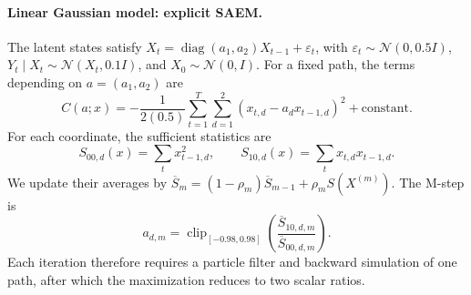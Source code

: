 \documentclass[11pt]{article}
\theoremstyle{thmstylethree}%
\begin{document}
\paragraph{Linear Gaussian model: explicit SAEM.}
The latent states satisfy
$X_t=\operatorname{diag}(a_1,a_2)X_{t-1}+\varepsilon_t$,
with $\varepsilon_t\sim\mathcal N(0,0.5I)$,
$Y_t\mid X_t\sim\mathcal N(X_t,0.1I)$, and
$X_0\sim\mathcal N(0,I)$.
For a fixed path, the terms depending on $a=(a_1,a_2)$ are
\[
 C(a;x)=-\frac{1}{2(0.5)}
     \sum_{t=1}^T\sum_{d=1}^2(x_{t,d}-a_dx_{t-1,d})^2
     +\text{constant}.
\]
For each coordinate, the sufficient statistics are
\[
 S_{00,d}(x)=\sum_t x_{t-1,d}^2,
 \qquad S_{10,d}(x)=\sum_t x_{t,d}x_{t-1,d}.
\]
We update their averages by
$\overline S_m=(1-\rho_m)\overline S_{m-1}+\rho_m S(X^{(m)})$.
The M-step is
\begin{equation}
 a_{d,m}=\operatorname{clip}_{[-0.98,0.98]}
       \left(\frac{\overline S_{10,d,m}}{\overline S_{00,d,m}}\right).
 \label{eq:benchmark-linear-mstep}
\end{equation}
Each iteration therefore requires a particle filter and backward
simulation of one path, after which the maximization reduces to two
scalar ratios.
\end{document}
